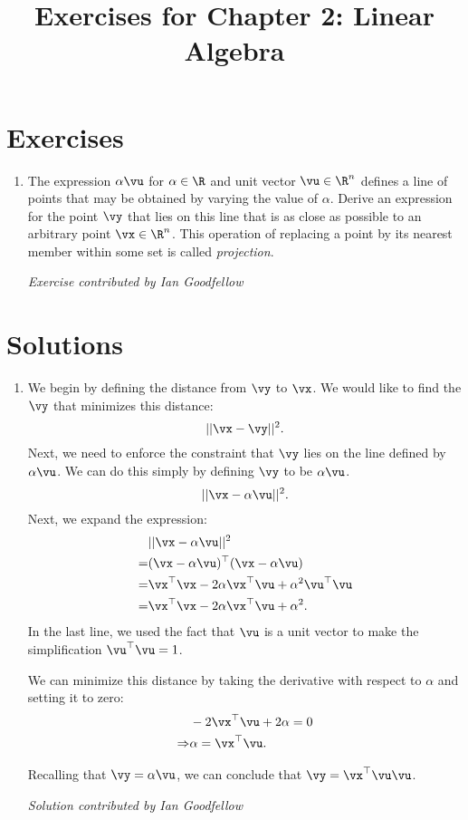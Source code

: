 \documentclass{article}
\title{Exercises for Chapter 2: Linear Algebra}
\begin{document}
\maketitle

\section*{Exercises}
\begin{enumerate}
\item The expression $\alpha \vu$ for $\alpha \in \R$ and
unit vector $\vu \in \R^n$ defines a line of points that may be obtained by varying the
value of $\alpha$.
Derive an expression for the point $\vy$ that lies on this line that is
as close as possible to an arbitrary point $\vx \in \R^n$.
This operation of replacing a point by its nearest member within some set
is called {\em projection}.


{\em Exercise contributed by Ian Goodfellow}
\end{enumerate}

\section*{Solutions}
\begin{enumerate}
\item We begin by defining the distance from $\vy$ to $\vx$. We would like to
find the $\vy$ that minimizes this distance:
\begin{equation}
|| \vx - \vy||^2.
\end{equation}
Next, we need to enforce the constraint that $\vy$ lies on the line defined
by $\alpha \vu$. We can do this simply by defining $\vy$ to be $\alpha \vu$.
\begin{equation}
|| \vx - \alpha \vu ||^2.
\end{equation}
Next, we expand the expression:
\begin{align}
& || \vx - \alpha \vu ||^2 \\
=& ( \vx - \alpha \vu )^\top (\vx - \alpha \vu) \\
=& \vx^\top \vx - 2 \alpha \vx^\top \vu + \alpha^2 \vu^\top \vu \\
=& \vx^\top \vx - 2 \alpha \vx^\top \vu + \alpha^2.
\end{align}
In the last line, we used the fact that $\vu$ is a unit vector to make
the simplification $\vu^\top \vu = 1$.

We can minimize this distance by taking the derivative with respect to
$\alpha$ and setting it to zero:
\begin{align}
& - 2  \vx^\top \vu + 2 \alpha = 0 \\
\Rightarrow & \alpha = \vx^\top \vu.
\end{align}

Recalling that $\vy = \alpha \vu$, we can conclude that $\vy = \vx^\top \vu \vu$.

{\em Solution contributed by Ian Goodfellow}


\end{enumerate}
\end{document}
